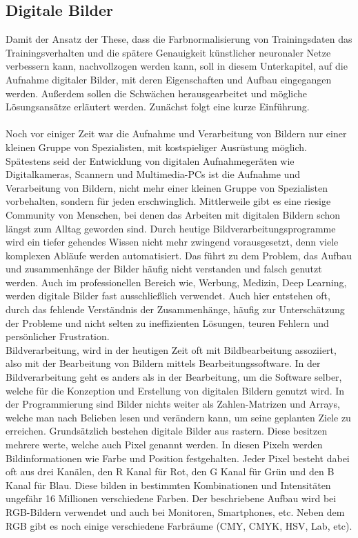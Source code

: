 \documentclass[a4paper,12pt,oneside]{article}
\begin{document}
  \subsection{Digitale Bilder}\label{s.digibilder}
Damit der Ansatz der These, dass die Farbnormalisierung von Trainingsdaten das Trainingsverhalten und die spätere Genauigkeit künstlicher neuronaler Netze verbessern kann, nachvollzogen werden kann, soll in diesem Unterkapitel, auf die Aufnahme digitaler Bilder, mit deren Eigenschaften und Aufbau eingegangen werden. Außerdem sollen die Schwächen herausgearbeitet und mögliche Lösungsansätze erläutert werden. Zunächst folgt eine kurze Einführung.\\\\
Noch vor einiger Zeit war die Aufnahme und Verarbeitung von Bildern nur einer kleinen Gruppe von Spezialisten, mit kostspieliger Ausrüstung möglich. Spätestens seid der Entwicklung von digitalen Aufnahmegeräten wie Digitalkameras, Scannern und Multimedia-PCs ist die Aufnahme und Verarbeitung von Bildern, nicht mehr einer kleinen Gruppe von Spezialisten vorbehalten, sondern für jeden erschwinglich. Mittlerweile gibt es eine riesige Community von Menschen, bei denen das Arbeiten mit digitalen Bildern schon längst zum Alltag geworden sind. Durch heutige Bildverarbeitungsprogramme wird ein tiefer gehendes Wissen nicht mehr zwingend vorausgesetzt, denn viele komplexen Abläufe werden automatisiert. Das führt zu dem Problem, das Aufbau und zusammenhänge der Bilder häufig nicht verstanden und falsch genutzt werden. Auch im professionellen Bereich wie, Werbung, Medizin, Deep Learning, werden digitale Bilder fast ausschließlich verwendet. Auch hier entstehen oft, durch das fehlende Verständnis der Zusammenhänge, häufig zur Unterschätzung der Probleme und nicht selten zu ineffizienten Lösungen, teuren Fehlern und persönlicher Frustration.\\
Bildverarbeitung, wird in der heutigen Zeit oft mit Bildbearbeitung assoziiert, also mit der Bearbeitung von Bildern mittels Bearbeitungssoftware. In der Bildverarbeitung geht es anders als in der Bearbeitung, um die Software selber, welche für die Konzeption und Erstellung von digitalen Bildern genutzt wird. In der Programmierung sind Bilder nichts weiter als Zahlen-Matrizen und Arrays, welche man nach Belieben lesen und verändern kann, um seine geplanten Ziele zu erreichen. Grundsätzlich bestehen digitale Bilder aus rastern. Diese besitzen mehrere werte, welche auch Pixel genannt werden. In diesen Pixeln werden Bildinformationen wie Farbe und Position festgehalten. Jeder Pixel besteht dabei oft aus drei Kanälen, den R Kanal für Rot, den G Kanal für Grün und den B Kanal für Blau. Diese bilden in bestimmten Kombinationen und Intensitäten ungefähr 16 Millionen verschiedene Farben. Der beschriebene Aufbau wird bei RGB-Bildern verwendet und auch bei Monitoren, Smartphones, etc. Neben dem RGB gibt es noch einige verschiedene Farbräume (CMY, CMYK, HSV, Lab, etc).\\\\
\end{document}
